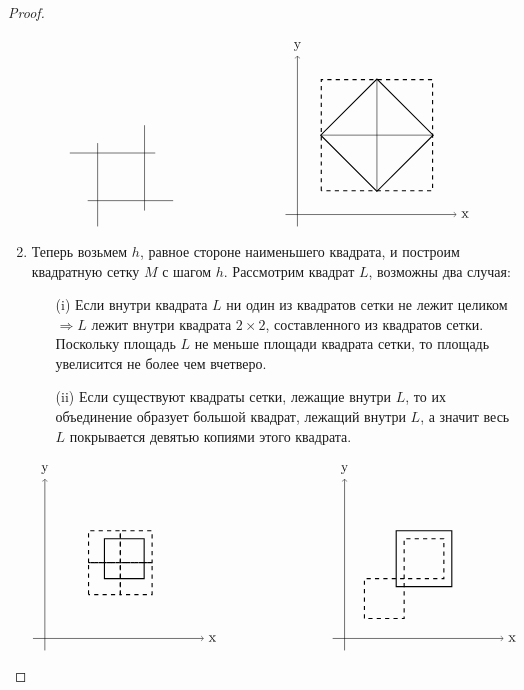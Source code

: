 \begin{proof}
\begin{enumerate}
\[\begin{tikzpicture}
            \draw[-] (0.7, 2.6) -- (2.85, 2.6);
            \draw[-] (1.15, 1.4) -- (3.3, 1.4);
            \draw[-] (1.4, 0.75) -- (1.4, 2.85);
            \draw[-] (2.58, 1.15) -- (2.58, 3.3);
        \end{tikzpicture}
        \tab[80pt]
        \begin{tikzpicture}
            \draw[->] (-0.3, 0) -- (4, 0) node[right] {x};
            \draw[->] (0, -0.3) -- (0, 4) node[above] {y};
            \draw[thick, rotate around={45:(2,2)}] (1, 1) rectangle (3, 3);
            \draw[thick, dashed] (0.6, 0.6) rectangle (3.4, 3.4);
            \draw[-] (2, 0.6) -- (2, 3.4);
            \draw[-] (0.6, 2) -- (3.4, 2);
        \end{tikzpicture}
        \]
        \item Теперь возьмем $h$, равное стороне наименьшего квадрата, и построим квадратную сетку $M$ с шагом $h$. Рассмотрим квадрат $L$, возможны два случая:
        \begin{itemize}
            \item[(i)] Если внутри квадрата $L$ ни один из квадратов сетки не лежит целиком $\Rightarrow L$ лежит внутри квадрата $2\times 2$, составленного из квадратов сетки. Поскольку площадь $L$ не меньше площади квадрата сетки, то площадь увелисится не более чем вчетверо.
            \item[(ii)] Если существуют квадраты сетки, лежащие внутри $L$, то их объединение образует большой квадрат, лежащий внутри $L$, а значит весь $L$ покрывается девятью копиями этого квадрата.
        \end{itemize}
        \[
        \begin{tikzpicture}
            \draw[->] (-0.3, 0) -- (4, 0) node[right] {x};
            \draw[->] (0, -0.3) -- (0, 4) node[above] {y};
            \draw[thick] (1.5, 1.5) rectangle (2.5, 2.5);
            \draw[thick, dashed] (1.1, 1.1) rectangle (1.9, 1.9);
            \draw[thick, dashed] (1.1, 1.9) rectangle (1.9, 2.7);
            \draw[thick, dashed] (1.9, 1.1) rectangle (2.7, 1.9);
            \draw[thick, dashed] (1.9, 1.9) rectangle (2.7, 2.7);
        \end{tikzpicture}
        \tab[80pt]
        \begin{tikzpicture}
            \draw[->] (-0.3, 0) -- (4, 0) node[right] {x};
            \draw[->] (0, -0.3) -- (0, 4) node[above] {y};
            \draw[thick, dashed] (1.5, 1.5) rectangle (2.5, 2.5);
            \draw[thick] (1.3, 1.3) rectangle (2.7, 2.7);
            \draw[thick, dashed] (0.5, 0.5) rectangle (1.5, 1.5);

\end{tikzpicture}\]
\end{enumerate}
\end{proof}
